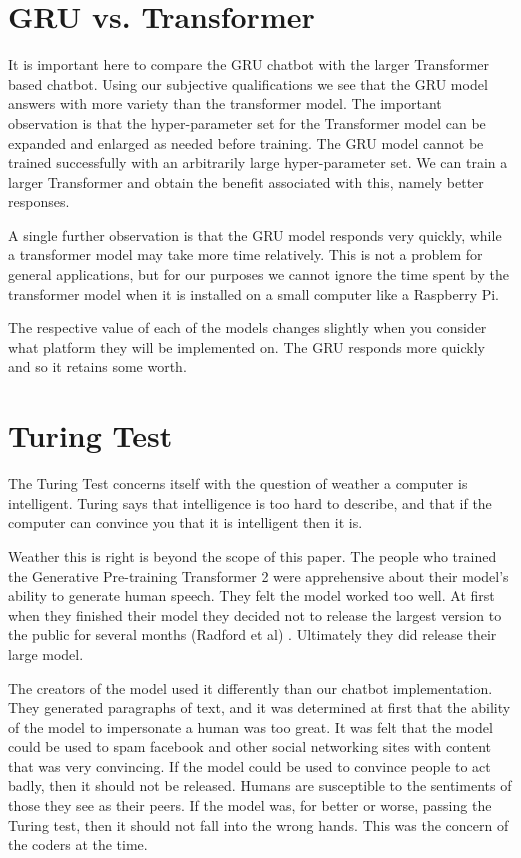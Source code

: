 

\section{GRU vs. Transformer}
It is important here to compare the GRU chatbot with the larger Transformer based chatbot. Using our subjective qualifications we see that the GRU model answers with more variety than the transformer model. The important observation is that the hyper-parameter set for the Transformer model can be expanded and enlarged as needed before training. The GRU model cannot be trained successfully with an arbitrarily large hyper-parameter set. We can train a larger Transformer and obtain the benefit associated with this, namely better responses.

A single further observation is that the GRU model responds very quickly, while a transformer model may take more time relatively. This is not a problem for general applications, but for our purposes we cannot ignore the time spent by the transformer model when it is installed on a small computer like a Raspberry Pi. 

The respective value of each of the models changes slightly when you consider what platform they will be implemented on. The GRU responds more quickly and so it retains some worth.


\section{Turing Test}

The Turing Test concerns itself with the question of weather a computer is intelligent. Turing says that intelligence is too hard to describe, and that if the computer can convince you that it is intelligent then it is.

Weather this is right is beyond the scope of this paper. The people who trained the Generative Pre-training Transformer 2 were apprehensive about their model's ability to generate human speech. They felt the model worked too well. At first when they finished their model they decided not to release the largest version to the public for several months (Radford et al) \cite{radford2019language}. Ultimately they did release their large model.

The creators of the model used it differently than our chatbot implementation. They generated paragraphs of text, and it was determined at first that the ability of the model to impersonate a human was too great. It was felt that the model could be used to spam facebook and other social networking sites with content that was very convincing. If the model could be used to convince people to act badly, then it should not be released. Humans are susceptible to the sentiments of those they see as their peers. If the model was, for better or worse, passing the Turing test, then it should not fall into the wrong hands. This was the concern of the coders at the time.

